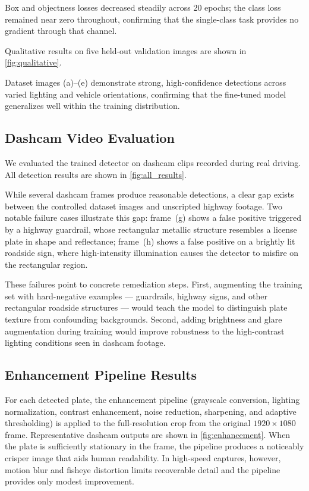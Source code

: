 \documentclass[times,10pt,twocolumn]{article}
\begin{document}
Box and objectness losses decreased steadily across 20 epochs; the
class loss remained near zero throughout, confirming that the
single-class task provides no gradient through that channel.

Qualitative results on five held-out validation images are shown in
\cref{fig:qualitative}.

Dataset images (a)--(e) demonstrate strong, high-confidence detections across varied lighting and vehicle orientations, confirming that the fine-tuned model generalizes well within the training distribution.

\subsection{Dashcam Video Evaluation}
\label{sec:dashcam}

We evaluated the trained detector on dashcam clips recorded during real driving. All detection results are shown in \cref{fig:all_results}.

While several dashcam frames produce reasonable detections, a clear gap exists between the controlled dataset images and unscripted highway footage. Two notable failure cases illustrate this gap: frame~(g) shows a false positive triggered by a highway guardrail, whose rectangular metallic structure resembles a license plate in shape and reflectance; frame~(h) shows a false positive on a brightly lit roadside sign, where high-intensity illumination causes the detector to misfire on the rectangular region.

These failures point to concrete remediation steps. First, augmenting the training set with hard-negative examples --- guardrails, highway signs, and other rectangular roadside structures --- would teach the model to distinguish plate texture from confounding backgrounds. Second, adding brightness and glare augmentation during training would improve robustness to the high-contrast lighting conditions seen in dashcam footage.

\subsection{Enhancement Pipeline Results}
\label{sec:enhancement}

For each detected plate, the enhancement pipeline (grayscale conversion, lighting normalization, contrast enhancement, noise reduction, sharpening, and adaptive thresholding) is applied to the full-resolution crop from the original $1920\!\times\!1080$ frame. Representative dashcam outputs are shown in \cref{fig:enhancement}. When the plate is sufficiently stationary in the frame, the pipeline produces a noticeably crisper image that aids human readability. In high-speed captures, however, motion blur and fisheye distortion limits recoverable detail and the pipeline provides only modest improvement.
\end{document}
